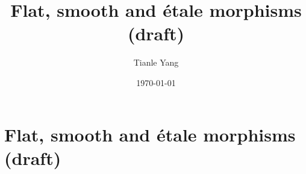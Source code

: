 \documentclass{noteformyself}
\title{Flat, smooth and étale morphisms (draft)}
\author{Tianle Yang}
\date{\today}
\begin{document}
    \maketitle

    \section{Flat, smooth and étale morphisms (draft)}


\end{document}
